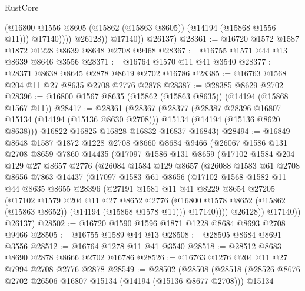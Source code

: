 \begin{lexlean}{RustCore}
\begin{coremodule}
                      (@16800 @1556 @8605 (@15862 (@15863 @8605)) (@14194 (@15868 @1556 @11)))
                      @17140))))
              @26128))
          @17140))
      @26137)
@28361 := @16720 @1572 @1587 @1872 @1228 @8639 @8648 @2708 @9468
@28367 := @16755 @1571 @44 @13 @8639 @8646 @3556
@28371 := @16764 @1570 @11 @41 @3540
@28377 := @28371 @8638 @8645 @2878 @8619 @2702 @16786
@28385 := @16763 @1568 @204 @11 @27 @8635 @2708 @2776 @2878
@28387 := @28385 @8629 @2702
@28396 := @16800 @1567 @8635 (@15862 (@15863 @8635)) (@14194 (@15868 @1567 @11))
@28417 := @28361
    (@28367
      (@28377
        (@28387 @28396 @16807 @15134 (@14194 (@15136 @8630 @2708)))
        @15134
        (@14194 (@15136 @8620 @8638)))
      @16822
      @16825
      @16828
      @16832
      @16837
      @16843)
@28494 := @16849
    @8648
    @1587
    @1872
    @1228
    @2708
    @8660
    @8684
    @9466
    (@26067
      @1586
      @131
      @2708
      @8659
      @7860
      @14435
      (@17097
        @1586
        @131
        @8659
        (@17102
          @1584
          @204
          @129
          @27
          @8657
          @2776
          (@26084
            @1584
            @129
            @8657
            (@26088
              @1583
              @61
              @2708
              @8656
              @7863
              @14437
              (@17097
                @1583
                @61
                @8656
                (@17102
                  @1568
                  @1582
                  @11
                  @44
                  @8635
                  @8655
                  @28396
                  (@27191
                    @1581
                    @11
                    @41
                    @8229
                    @8654
                    @27205
                    (@17102
                      @1579
                      @204
                      @11
                      @27
                      @8652
                      @2776
                      (@16800 @1578 @8652 (@15862 (@15863 @8652)) (@14194 (@15868 @1578 @11)))
                      @17140))))
              @26128))
          @17140))
      @26137)
@28502 := @16720 @1590 @1596 @1871 @1228 @8684 @8693 @2708 @9466
@28505 := @16755 @1589 @44 @13
@28508 := @28505 @8684 @8691 @3556
@28512 := @16764 @1278 @11 @41 @3540
@28518 := @28512 @8683 @8690 @2878 @8666 @2702 @16786
@28526 := @16763 @1276 @204 @11 @27 @7994 @2708 @2776 @2878
@28549 := @28502
    (@28508
      (@28518
        (@28526 @8676 @2702 @26506 @16807 @15134 (@14194 (@15136 @8677 @2708)))
        @15134

\end{coremodule}
\end{lexlean}
